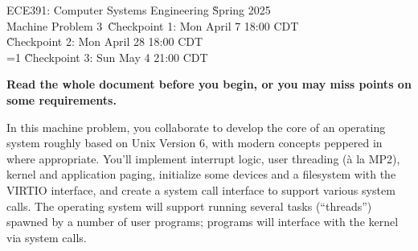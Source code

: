 \documentclass{article}
\begin{document}
\newcommand{\rendercpi}{1}
\newcommand{\rendercpii}{1}
\newcommand{\rendercpiii}{1}
\newcommand{\showallduedates}{1}
\newcommand{\renderec}{0}
\newcommand{\renderappA}{1}
\newcommand{\renderappB}{1}
\newcommand{\renderappC}{1}
\newcommand{\renderappD}{1}
\newcommand{\renderappE}{0}
\newcommand{\renderappF}{0}
\newcommand{\renderappG}{0}
\newcommand{\renderappH}{1}

\newlength{\sus}
\newlength{\supersus}



{\large \bf
    \begin{tabbing}
    ECE391: Computer Systems Engineering \` Spring 2025\\
    Machine Problem 3\
    \` Checkpoint 1: Mon April \hphantom{1}7 18:00 CDT \\
	\` Checkpoint 2: Mon April 28 18:00 CDT \\
    \ifnum\showallduedates=1
	\` Checkpoint 3: Sun\hspace{\supersus} May\hspace{\sus} \hphantom{1}4 21:00 CDT
    \else
    \fi
    \end{tabbing}
}
\bigskip
{}
\bigskip

\pagestyle{plain}
\tableofcontents \vspace{-6pt}


\pagebreak

{\bf Read the whole document before you begin, or you may miss points
	on some requirements.}

In this machine problem, you collaborate to develop the core of
an operating system roughly based on Unix Version 6, with modern concepts
peppered in where appropriate.
You'll implement interrupt logic, user threading (à la MP2), kernel and
application paging, initialize some devices and a filesystem with the VIRTIO
interface, and create a system call interface to support various system calls.
The operating system will support running several tasks (``threads'') spawned by
a number of user programs; programs will interface with the kernel via system calls.
\end{document}
